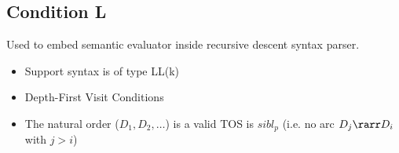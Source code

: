 \subsection{Condition L}
Used to embed semantic evaluator inside recursive descent syntax parser.
\begin{itemize}
    \item Support syntax is of type LL(k)
    \item Depth-First Visit Conditions
    \item The natural order ($D_1, D_2, \ldots$) is a valid TOS is $sibl_p$ (i.e. no arc $D_j\rarr D_i$ with $j>i$)
\end{itemize}
